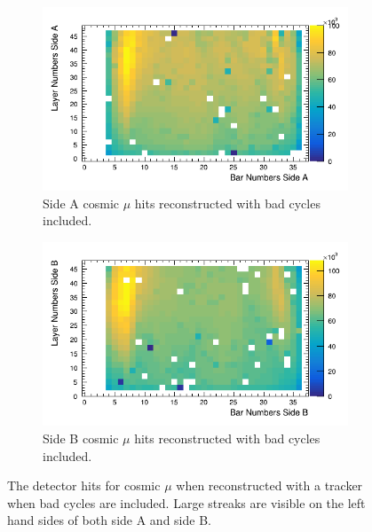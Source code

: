 \begin{figure}[htbp]
\centering
\begin{subfigure}{.5\textwidth}
  \centering
  \includegraphics[width=\linewidth]{Chapter5/Figs/Raster/sideAHitsWithBadCycles.png}
  \captionsetup{width=.9\linewidth}
  \caption{Side A cosmic $\mu$ hits reconstructed with bad cycles included.} 
  \label{subFig:sideAHitsWithBadCycles}
\end{subfigure}%
\begin{subfigure}{.5\textwidth}
  \centering
\includegraphics[width=\linewidth]{Chapter5/Figs/Raster/sideBHitsWithBadCycles.png}
  \captionsetup{width=.9\linewidth}
  \caption{Side B cosmic $\mu$ hits reconstructed with bad cycles included.}
  \label{subFig:sideBHitsWithBadCycles}
\end{subfigure}
\caption{The detector hits for cosmic $\mu$ when reconstructed with a tracker when bad cycles are included. Large streaks are visible on the left hand sides of both side A and side B.}
\label{fig:sideABHitsWithBadCycles}
\end{figure}

